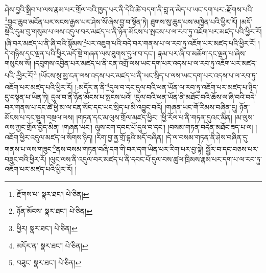 ཤེས་བྱའི་སྒྲིབ་པ་ལས་རྣམ་པར་གྲོལ་བའི་ཁྱད་པར་ནི་དེའི་ཚེ་བདག་ནི་བླ་ན་མེད་པ་ཡང་དག་པར་:རྫོགས་པའི་\footnote{རྫོགས་པ་  སྣར་ཐང་།  པེ་ཅིན། }བྱང་ཆུབ་མངོན་པར་སངས་རྒྱས་པར་ཤེས་སོ་ཞེས་བྱ་བ་སྟོན་ཏེ། ཐུགས་སུ་ཆུད་པས་མཁྱེན་པའི་ཕྱིར་རོ། །མདོ་སྡེའི་དུམ་བུ་གསུམ་པ་ལས་འདུལ་བར་མཛད་པ་ནི་ཉོན་མོངས་པ་སྤངས་པ་ལ་རབ་ཏུ་འཇོག་པར་མཛད་པའི་ཕྱིར་རོ། །ཞི་བར་མཛད་པ་ནི་ཞི་བའི་སྙོམས་\footnote{ཉོན་མོངས་  སྣར་ཐང་།  པེ་ཅིན། }པར་འཇུག་པའི་བདེ་བར་གནས་པ་ལ་རབ་ཏུ་འཇོག་པར་མཛད་པའི་ཕྱིར་རོ། །དེ་གཉིས་དང་ལྡན་པའི་ཕྱིར་མདོ་སྡེ་གཞན་ལས་ཐུགས་དུལ་བ་དང་། རྣམ་པར་ཞི་བ་མཆོག་དང་ལྡན་པ་ཞེས་གསུངས་སོ། །དབུགས་འབྱིན་པར་མཛད་པ་ནི་ངན་འགྲོ་ལས་ཡང་དག་པར་འདས་པ་ལ་རབ་ཏུ་འཇོག་པར་མཛད་པའི་:ཕྱིར་རོ།\footnote{ཕྱིར།  སྣར་ཐང་།  པེ་ཅིན། } །ཡོངས་སུ་མྱ་ངན་ལས་འདས་པར་མཛད་པ་ནི་ཡང་སྲིད་པ་ལས་ཡང་དག་པར་འདས་པ་ལ་རབ་ཏུ་འཇོག་པར་མཛད་པའི་ཕྱིར་རོ། །:མདོར་ན་ནི་\footnote{མདོར་ན་  སྣར་ཐང་།  པེ་ཅིན། }དུལ་བ་དང་དུལ་བའི་ཕན་ཡོན་ལ་རབ་ཏུ་འཇོག་པར་མཛད་པ་ཉིད་དུ་བསྟན་པ་ཡིན་ཏེ། དུལ་བ་ནི་ཉོན་མོངས་པ་སྤངས་པའོ། །དུལ་བའི་ཕན་ཡོན་ནི་མཐོང་བའི་ཆོས་ལ་ཞི་བའི་བདེ་བར་གནས་པ་དང་ཚེ་ཕྱི་མ་ལ་ངན་སོང་དང་ཡང་སྲིད་པ་མི་འབྱུང་བའོ། །གཞན་ཡང་གོ་རིམས་བཞིན་དུ། ཉོན་མོངས་པ་དང་སྡུག་བསྔལ་ལས། །གཏན་དང་མ་ལུས་གྲོལ་མཛད་ཕྱིར། །ཕྱི་རོལ་པ་ནི་གཏན་དུའང་མིན། །མ་ལུས་ལས་ཀྱང་གྲོལ་བྱེད་མིན། །གཞན་ཡང་། ལུས་ངག་དབང་པོ་དུལ་བ་དང་། །བསམ་གཏན་བདེན་མཐོང་ཟད་པ་ལ། །འཇོག་ཕྱིར་འདུལ་མཛད་ལ་སོགས་ཉིད། །རིག་བྱ་ནྱ་གྲོ་དྷའི་མདོ་བཞིན། །དེ་ལ་བསམ་གཏན་ནི་ཤེས་བཞིན་དུ་གནས་པ་ལས་གཟུང་\footnote{བཟུང་  སྣར་ཐང་།  པེ་ཅིན། }ནས་བསམ་གཏན་བཞི་དག་གི་བར་དག་ཡིན་པར་རིག་པར་བྱ་སྟེ། སྦྱོར་བ་དང་བཅས་པར་བཟུང་བའི་ཕྱིར་རོ། །ལུང་ལས་ནི་འདུལ་བར་མཛད་པ་ནི་དབང་པོ་དུལ་བས་ཚུལ་ཁྲིམས་རྣམ་པར་དག་པ་ལ་རབ་ཏུ་འཇོག་པར་མཛད་པའི་ཕྱིར་རོ། །
